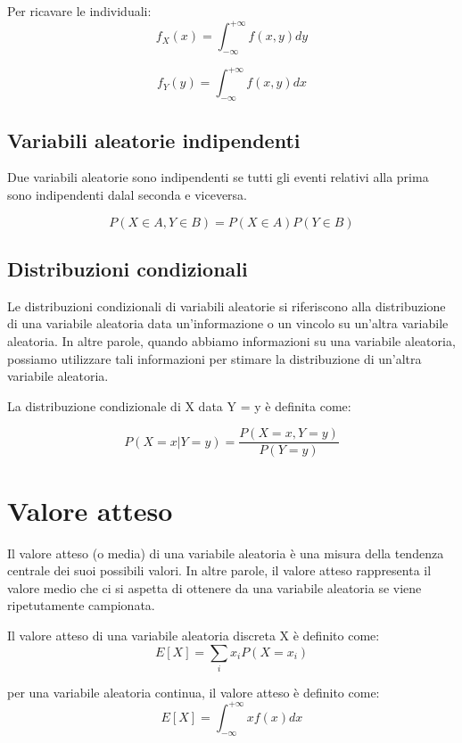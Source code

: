 Per ricavare le individuali:
\begin{equation}
  f_X(x) = \int_{-\infty}^{+\infty} f(x, y)dy
\end{equation}

\begin{equation}
  f_Y(y) = \int_{-\infty}^{+\infty} f(x, y)dx
\end{equation}

\subsection{Variabili aleatorie indipendenti}

Due variabili aleatorie sono indipendenti se tutti gli eventi relativi alla prima sono indipendenti dalal seconda e viceversa.

\begin{equation}
  P(X \in A, Y \in B) = P(X \in A)P(Y \in B)
\end{equation}

\subsection{Distribuzioni condizionali}
Le distribuzioni condizionali di variabili aleatorie si riferiscono alla distribuzione di una variabile aleatoria data un'informazione o un vincolo su un'altra variabile aleatoria. In altre parole, quando abbiamo informazioni su una variabile aleatoria, possiamo utilizzare tali informazioni per stimare la distribuzione di un'altra variabile aleatoria.

La distribuzione condizionale di X data Y = y è definita come:

$$P(X = x | Y = y) = \frac{P(X = x, Y = y)}{P(Y = y)}$$

\section{Valore atteso}
Il valore atteso (o media) di una variabile aleatoria è una misura della tendenza centrale dei suoi possibili valori. In altre parole, il valore atteso rappresenta il valore medio che ci si aspetta di ottenere da una variabile aleatoria se viene ripetutamente campionata.

Il valore atteso di una variabile aleatoria discreta X è definito come:
\begin{equation}
  E[X] = \sum_i x_i P(X = x_i)
\end{equation}

per una variabile aleatoria continua, il valore atteso è definito come:
\begin{equation}
  E[X] = \int_{-\infty}^{+\infty} xf(x)dx
\end{equation}



